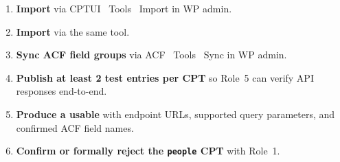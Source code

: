 \documentclass[12pt,a4paper]{article}
\begin{document}
\begin{enumerate}
    \item \textbf{Import } via CPTUI \textrightarrow\
          Tools \textrightarrow\ Import in WP admin.
    \item \textbf{Import } via the same tool.
    \item \textbf{Sync ACF field groups} via ACF \textrightarrow\ Tools
          \textrightarrow\ Sync in WP admin.
    \item \textbf{Publish at least 2 test entries per CPT} so Role~5 can
          verify API responses end-to-end.
    \item \textbf{Produce a usable }
          with endpoint URLs, supported query parameters, and confirmed ACF
          field names.
    \item \textbf{Confirm or formally reject the \texttt{people} CPT}
          with Role~1.
\end{enumerate}
\end{document}
